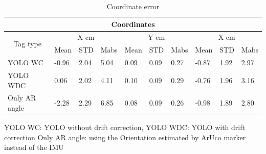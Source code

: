 \documentclass[12pt, twoside]{report}
\begin{document}
\begin{table}[]
    \centering
    \begin{tabular}{|llllllllll|}
        \hline
        \multicolumn{10}{|c|}{Coordinates}                                                                                                                                                                                                                                                       \\ \hline
        \multicolumn{1}{|c|}{\multirow{2}{*}{Tag type}} & \multicolumn{3}{c|}{X cm}  & \multicolumn{3}{c|}{Y cm} & \multicolumn{3}{c|}{X cm}                                                                                                                                                     \\ \cline{2-10}
        \multicolumn{1}{|c|}{}                          & \multicolumn{1}{l|}{Mean}  & \multicolumn{1}{l|}{STD}  & \multicolumn{1}{l|}{Mabs} & \multicolumn{1}{l|}{Mean} & \multicolumn{1}{l|}{STD}  & \multicolumn{1}{l|}{Mabs} & \multicolumn{1}{l|}{Mean}  & \multicolumn{1}{l|}{STD}  & Mabs \\ \hline
        \multicolumn{1}{|l|}{YOLO WC}                   & \multicolumn{1}{l|}{-0.96} & \multicolumn{1}{l|}{2.04} & \multicolumn{1}{l|}{5.04} & \multicolumn{1}{l|}{0.09} & \multicolumn{1}{l|}{0.09} & \multicolumn{1}{l|}{0.27} & \multicolumn{1}{l|}{-0.87} & \multicolumn{1}{l|}{1.92} & 2.97 \\ \hline
        \multicolumn{1}{|l|}{YOLO WDC}                  & \multicolumn{1}{l|}{0.06}  & \multicolumn{1}{l|}{2.02} & \multicolumn{1}{l|}{4.11} & \multicolumn{1}{l|}{0.10} & \multicolumn{1}{l|}{0.09} & \multicolumn{1}{l|}{0.29} & \multicolumn{1}{l|}{-0.76} & \multicolumn{1}{l|}{1.96} & 3.16 \\ \hline
        \multicolumn{1}{|l|}{Only AR angle}             & \multicolumn{1}{l|}{-2.28} & \multicolumn{1}{l|}{2.29} & \multicolumn{1}{l|}{6.85} & \multicolumn{1}{l|}{0.08} & \multicolumn{1}{l|}{0.09} & \multicolumn{1}{l|}{0.26} & \multicolumn{1}{l|}{-0.98} & \multicolumn{1}{l|}{1.89} & 2.80 \\ \hline
    \end{tabular}
    \caption{Coordinate error}
    {YOLO WC: YOLO without drift correction, YOLO WDC: YOLO with drift correction
    Only AR angle: using the Orientation estimated by ArUco marker instead of the IMU}
    \label{tab:three_marker_accuracy}

\end{table}
\end{document}
